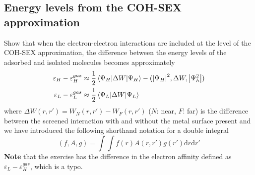 \subsection{Energy levels from the COH-SEX approximation}
\begin{exercise}
Show that when the electron-electron interactions are included at the level of the COH-SEX approximation, the difference between the energy levels of the adsorbed and isolated molecules becomes approximately
\begin{align}
    \varepsilon_H - \varepsilon_H^{gas} &\approx \dfrac{1}{2}\mel{\Psi_H}{\Delta W}{\Psi_H} - (\abs{\Psi_H}^2,\Delta W,\abs{\Psi_{h}^2}) \\
    \varepsilon_L - \varepsilon_L^{gas} &\approx \dfrac{1}{2}\mel{\Psi_L}{\Delta W}{\Psi_L}
\end{align}
where $\Delta W(r,r') = W_{N}(r,r') - W_{F}(r,r')$ ($N$: near, $F$: far) is the difference between the screened interaction with and without the metal surface present and we have introduced the following shorthand notation for a double integral
\begin{equation}
    (f,A,g) = \int \int f(r)A(r,r')g(r') \mathrm{d}r\mathrm{d}r'
\end{equation}
\textbf{Note} that the exercise has the difference in the electron affinity defined as $\varepsilon_L-\varepsilon_H^{gas}$, which is a typo.
\end{exercise}
